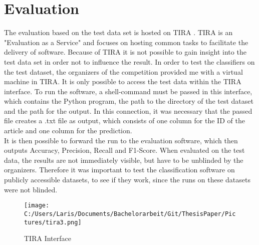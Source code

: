 \documentclass[a4paper, 11pt,titlepage,oneside,openany]{book}
\begin{document}
\chapter{Evaluation}
The evaluation based on the test data set is hosted on TIRA \cite{tira}. TIRA is an "Evaluation as a Service" \cite{evaluationasaservice} and focuses on hosting common tasks to facilitate the delivery of software. Because of TIRA it is not possible to gain insight into the test data set in order not to influence the result.
In order to test the classifiers on the test dataset, the organizers of the competition provided me with a virtual machine in TIRA. It is only possible to access the test data within the TIRA interface. To run the software, a shell-command must be passed in this interface, which contains the Python program, the path to the directory of the test dataset and the path for the output. In this connection, it was necessary that the passed file creates a .txt file as output, which consists of one column for the ID of the article and one column for the prediction. \\
\indent It is then possible to forward the run to the evaluation software, which then outputs Accuracy, Precision, Recall and F1-Score. When evaluated on the test data, the results are not immediately visible, but have to be unblinded by the organizers. Therefore it was important to test the classification software on publicly accessible datasets, to see if they work, since the runs on these datasets were not blinded. 
\begin{figure}[h]
	\centering
	\texttt{[image: C:/Users/Laris/Documents/Bachelorarbeit/Git/ThesisPaper/Pictures/tira3.png]}
	\caption{TIRA Interface}
\end{figure}
\end{document}
